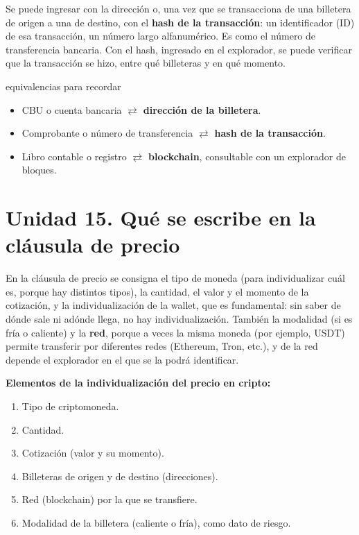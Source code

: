 \documentclass[12pt,oneside,a4paper]{book}
\begin{document}
Se puede ingresar con la dirección o, una vez que se transacciona de una billetera de origen a una de destino, con el \textbf{hash de la transacción}: un identificador (ID) de esa transacción, un número largo alfanumérico. Es como el número de transferencia bancaria. Con el hash, ingresado en el explorador, se puede verificar que la transacción se hizo, entre qué billeteras y en qué momento.

\begin{definition}{equivalencias para recordar}
\begin{itemize}
    \item CBU o cuenta bancaria $\rightleftarrows$ \textbf{dirección de la billetera}.
    \item Comprobante o número de transferencia $\rightleftarrows$ \textbf{hash de la transacción}.
    \item Libro contable o registro $\rightleftarrows$ \textbf{blockchain}, consultable con un explorador de bloques.
\end{itemize}
\end{definition}

\section{Unidad 15. Qué se escribe en la cláusula de precio}

En la cláusula de precio se consigna el tipo de moneda (para individualizar cuál es, porque hay distintos tipos), la cantidad, el valor y el momento de la cotización, y la individualización de la wallet, que es fundamental: sin saber de dónde sale ni adónde llega, no hay individualización. También la modalidad (si es fría o caliente) y la \textbf{red}, porque a veces la misma moneda (por ejemplo, USDT) permite transferir por diferentes redes (Ethereum, Tron, etc.), y de la red depende el explorador en el que se la podrá identificar.

\begin{important}
\textbf{Elementos de la individualización del precio en cripto:}
\begin{enumerate}
    \item Tipo de criptomoneda.
    \item Cantidad.
    \item Cotización (valor y su momento).
    \item Billeteras de origen y de destino (direcciones).
    \item Red (blockchain) por la que se transfiere.
    \item Modalidad de la billetera (caliente o fría), como dato de riesgo.
\end{enumerate}
\end{important}
\end{document}
